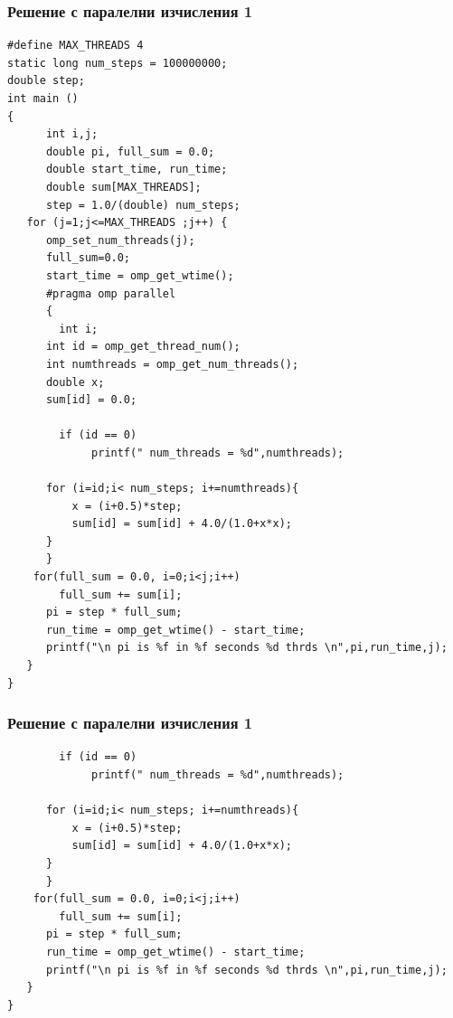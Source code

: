 \documentclass{beamer}
\begin{document}
\begin{frame}
  \frametitle{Решение с паралелни изчисления 1}
\scriptsize
\lstset{language=C++}
\begin{lstlisting}
#define MAX_THREADS 4
static long num_steps = 100000000;
double step;
int main ()
{
	  int i,j;
	  double pi, full_sum = 0.0;
	  double start_time, run_time;
	  double sum[MAX_THREADS];
	  step = 1.0/(double) num_steps;
   for (j=1;j<=MAX_THREADS ;j++) {
      omp_set_num_threads(j);
      full_sum=0.0;
      start_time = omp_get_wtime();
      #pragma omp parallel
      {
        int i;
	  int id = omp_get_thread_num();
	  int numthreads = omp_get_num_threads();
	  double x;
	  sum[id] = 0.0;

        if (id == 0) 
             printf(" num_threads = %d",numthreads);

	  for (i=id;i< num_steps; i+=numthreads){
		  x = (i+0.5)*step;
		  sum[id] = sum[id] + 4.0/(1.0+x*x);
	  }
      }
	for(full_sum = 0.0, i=0;i<j;i++)
	    full_sum += sum[i];
      pi = step * full_sum;
      run_time = omp_get_wtime() - start_time;
      printf("\n pi is %f in %f seconds %d thrds \n",pi,run_time,j);
   }
}	  
    \end{lstlisting}
  
\end{frame}

\begin{frame}
  \frametitle{Решение с паралелни изчисления 1}
\scriptsize
\lstset{language=C++}
\begin{lstlisting}
        if (id == 0) 
             printf(" num_threads = %d",numthreads);

	  for (i=id;i< num_steps; i+=numthreads){
		  x = (i+0.5)*step;
		  sum[id] = sum[id] + 4.0/(1.0+x*x);
	  }
      }
	for(full_sum = 0.0, i=0;i<j;i++)
	    full_sum += sum[i];
      pi = step * full_sum;
      run_time = omp_get_wtime() - start_time;
      printf("\n pi is %f in %f seconds %d thrds \n",pi,run_time,j);
   }
}	  
    \end{lstlisting}  
\end{frame}
\end{document}
